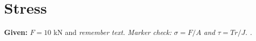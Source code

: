 \documentclass[11pt]{article}
\newcommand{\given}[1]{\textbf{Given:} #1}
\newenvironment{remember}{\itshape}{}
\begin{document}
\section*{Stress}
\given{$F=10$ kN} and \begin{remember}remember text\end{remember}.
Marker check: $\sigma=F/A$\examgiven{} and $\tau=T r/J$\examremember.
 .
\begin{tmsheet}
\end{tmsheet}
\end{document}
